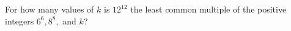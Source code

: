 For how many values of $k$ is $12^{12}$ the least common multiple of the positive integers $6^6, 8^8,$ and $k$?
